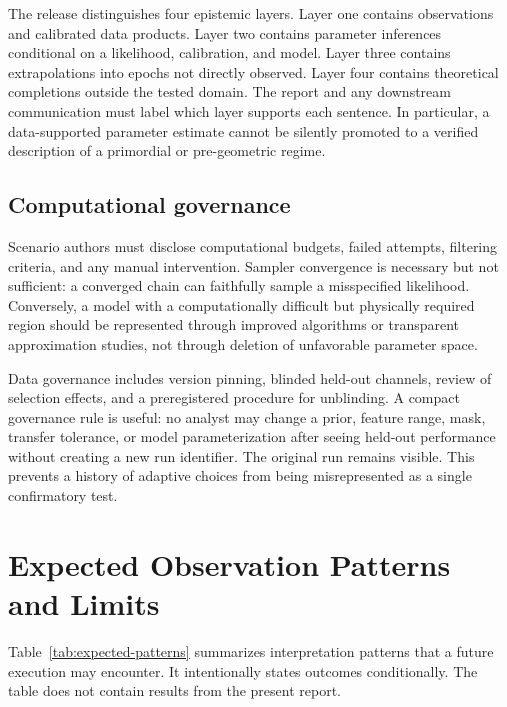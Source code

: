 \documentclass[10pt,conference]{IEEEtran}
\begin{document}
The release distinguishes four epistemic layers. Layer one contains observations and calibrated data products. Layer two contains parameter inferences conditional on a likelihood, calibration, and model. Layer three contains extrapolations into epochs not directly observed. Layer four contains theoretical completions outside the tested domain. The report and any downstream communication must label which layer supports each sentence. In particular, a data-supported parameter estimate cannot be silently promoted to a verified description of a primordial or pre-geometric regime.

\subsection{Computational governance}

Scenario authors must disclose computational budgets, failed attempts, filtering criteria, and any manual intervention. Sampler convergence is necessary but not sufficient: a converged chain can faithfully sample a misspecified likelihood. Conversely, a model with a computationally difficult but physically required region should be represented through improved algorithms or transparent approximation studies, not through deletion of unfavorable parameter space.

Data governance includes version pinning, blinded held-out channels, review of selection effects, and a preregistered procedure for unblinding. A compact governance rule is useful: no analyst may change a prior, feature range, mask, transfer tolerance, or model parameterization after seeing held-out performance without creating a new run identifier. The original run remains visible. This prevents a history of adaptive choices from being misrepresented as a single confirmatory test.

\section{Expected Observation Patterns and Limits}
\label{sec:expected-patterns}

Table~\ref{tab:expected-patterns} summarizes interpretation patterns that a future execution may encounter. It intentionally states outcomes conditionally. The table does not contain results from the present report.
\end{document}
